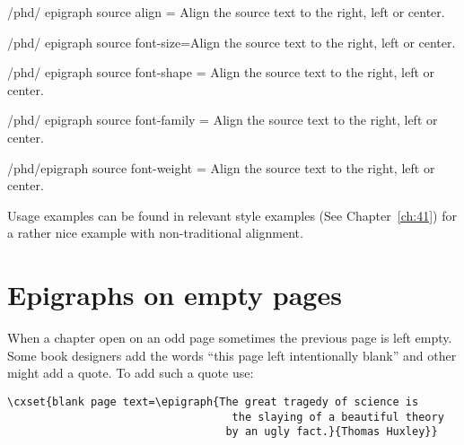 \begin{key}{/phd/ epigraph source align = }
Align the source text to the right, left or center.
\end{key}

\begin{key}{/phd/ epigraph source font-size=}Align the source text to the right, left or center.
\end{key}

\begin{key}{/phd/ epigraph source font-shape = }
Align the source text to the right, left or center.
\end{key}

\begin{key}{/phd/ epigraph source font-family = }Align the source text to the right, left or center.
\end{key}


\begin{key}{/phd/epigraph source font-weight = }
Align the source text to the right, left or center.
\end{key}


Usage examples can be found in relevant style examples (See Chapter~\ref{ch:41}) for a rather 
nice example with non-traditional alignment.

\section{Epigraphs on empty pages}

When a chapter open on an odd page sometimes the  previous page is left empty. Some book designers 
add the words ``this page left intentionally blank'' and other might add a quote. To add such a quote use:

\begin{verbatim}
\cxset{blank page text=\epigraph{The great tragedy of science is 
                                   the slaying of a beautiful theory
                                  by an ugly fact.}{Thomas Huxley}}
\end{verbatim}
